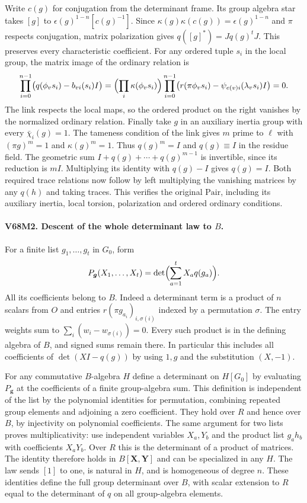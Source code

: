 Write $c(g)$ for conjugation from the determinant frame. Its group
algebra star takes $[g]$ to $\epsilon(g)^{1-n}[c(g)^{-1}]$. Since
$\kappa(g)\kappa(c(g))=\epsilon(g)^{1-n}$ and $\pi$ respects
conjugation, matrix polarization gives $q([g]^*)=Jq(g)^tJ$. This
preserves every characteristic coefficient. For any ordered tuple
$s_i$ in the local group, the matrix image of the ordinary relation is
\[
 \prod_{i=0}^{n-1}\bigl(q(\phi_v s_i)-b_{vi}(s_i)I\bigr)=
 \Bigl(\prod_i\kappa(\phi_v s_i)\Bigr)
 \prod_{i=0}^{n-1}\bigl(r(\pi\phi_v s_i)-
                         \psi_{e(v)i}(\lambda_v s_i)I\bigr)=0.
\]
The link respects the local maps, so the ordered product on the right
vanishes by the normalized ordinary relation. Finally take $g$ in an
auxiliary inertia group with every $\bar\chi_i(g)=1$. The tameness condition
of the link gives $m$ prime to $\ell$ with $(\pi g)^m=1$ and
$\kappa(g)^m=1$. Thus $q(g)^m=I$ and $q(g)\equiv I$ in the residue
field. The geometric sum $I+q(g)+\cdots+q(g)^{m-1}$ is invertible,
since its reduction is $mI$. Multiplying its identity with $q(g)-I$
gives $q(g)=I$. Both required trace relations now follow by left
multiplying the vanishing matrices by any $q(h)$ and taking traces.
This verifies the original $\mathrm{Pair}$, including its auxiliary
inertia, local torsion, polarization and ordered ordinary conditions.

\paragraph{V68M2. Descent of the whole determinant law to $B$.}
For a finite list $g_1,\ldots,g_t$ in $G_0$, form
\[
 P_{\boldsymbol g}(X_1,\ldots,X_t)
        =\det\Bigl(\sum_{a=1}^t X_a q(g_a)\Bigr).
\]
All its coefficients belong to $B$. Indeed a determinant term is a
product of $n$ scalars from $O$ and entries
$r(\pi g_{a_i})_{i,\sigma(i)}$ indexed by a permutation $\sigma$.
The entry weights sum to $\sum_i(w_i-w_{\sigma(i)})=0$.
Every such product is in the defining algebra of $B$, and signed sums
remain there. In particular this includes all coefficients of
$\det(XI-q(g))$ by using $1,g$ and the substitution $(X,-1)$.

For any commutative $B$-algebra $H$ define a determinant on $H[G_0]$
by evaluating $P_{\boldsymbol g}$ at the coefficients of a finite
group-algebra sum. This definition is independent of the list by the
polynomial identities for permutation, combining repeated group
elements and adjoining a zero coefficient. They hold over $R$ and
hence over $B$, by injectivity on polynomial coefficients. The same
argument for two lists proves multiplicativity: use independent
variables $X_a,Y_b$ and the product list $g_a h_b$ with coefficients
$X_aY_b$. Over $R$ this is the determinant of a product of matrices.
The identity therefore holds in $B[\boldsymbol X,\boldsymbol Y]$ and
can be specialized in any $H$. The law sends $[1]$ to one, is natural
in $H$, and is homogeneous of degree $n$. These identities define the
full group determinant over $B$, with scalar extension to $R$ equal to
the determinant of $q$ on all group-algebra elements.

